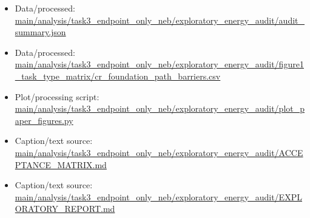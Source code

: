 \begin{itemize}[leftmargin=1.4em,noitemsep]
\item Data/processed: \begingroup\scriptsize\url{main/analysis/task3_endpoint_only_neb/exploratory_energy_audit/audit_summary.json}\endgroup
\item Data/processed: \begingroup\scriptsize\url{main/analysis/task3_endpoint_only_neb/exploratory_energy_audit/figure1_task_type_matrix/cr_foundation_path_barriers.csv}\endgroup
\item Plot/processing script: \begingroup\scriptsize\url{main/analysis/task3_endpoint_only_neb/exploratory_energy_audit/plot_paper_figures.py}\endgroup
\item Caption/text source: \begingroup\scriptsize\url{main/analysis/task3_endpoint_only_neb/exploratory_energy_audit/ACCEPTANCE_MATRIX.md}\endgroup
\item Caption/text source: \begingroup\scriptsize\url{main/analysis/task3_endpoint_only_neb/exploratory_energy_audit/EXPLORATORY_REPORT.md}\endgroup
\end{itemize}
